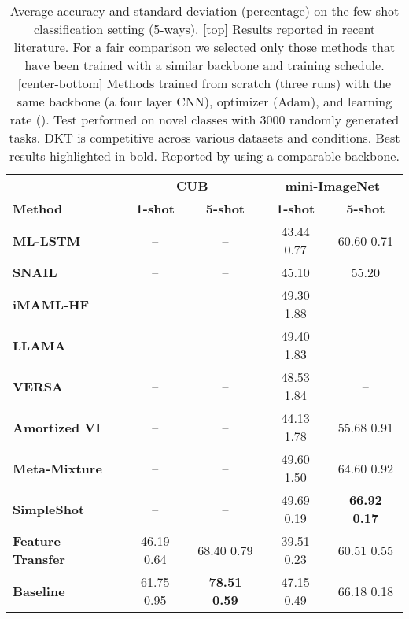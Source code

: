 \documentclass{article}
\begin{document}
\begin{table}[H]
\caption{Average accuracy and standard deviation (percentage) on the few-shot classification setting (5-ways). 
[top] Results reported in recent literature.  
For a fair comparison we selected only those methods that have been trained with a similar backbone and training schedule. [center-bottom] Methods trained from scratch (three runs) with the same backbone (a four layer CNN), optimizer (Adam), and learning rate (). Test performed on novel classes with 3000 randomly generated tasks. DKT is competitive across various datasets and conditions. Best results highlighted in bold. Reported by \citet{jerfel2019reconciling} using a comparable backbone.}
 \begin{adjustbox}{width=1.0\columnwidth,center}
\centering
{
\begin{tabular}{lcccc}
\hline
\textbf{} & \multicolumn{2}{c}{\textbf{CUB}} & \multicolumn{2}{c}{\textbf{mini-ImageNet}} \\
\small{\textbf{Method}} & \textbf{1-shot} & \textbf{5-shot} & \textbf{1-shot} & \textbf{5-shot}\\
\hline
\small{\textbf{ML-LSTM}} \citep{ravi2017optimization} & -- & --  & 43.44  \small{0.77} & 60.60  \small{0.71}\\
\small{\textbf{SNAIL}} \citep{mishra2018simple} & -- & --  & 45.10 & 55.20\\
\small{\textbf{iMAML-HF}} \citep{rajeswaran2019meta} & -- & --  & 49.30  \small{1.88} & --\\
\small{\textbf{LLAMA}} \citep{grant2018recasting} & -- & --  & 49.40  \small{1.83} & --\\
\small{\textbf{VERSA}} \citep{gordon2019meta} & -- & --  & 48.53  \small{1.84} & --\\
\small{\textbf{Amortized VI}} \citep{gordon2019meta} &  -- & --  & 44.13  \small{1.78} & 55.68  \small{0.91}\\
\small{\textbf{Meta-Mixture}} \citep{jerfel2019reconciling} &  -- & --  & 49.60  \small{1.50} & 64.60  \small{0.92}\\
\small{\textbf{SimpleShot}} \citep{wang2019simpleshot} &  -- & --  & 49.69  \small{0.19} & \textbf{66.92  \small{0.17}}\\
\hline
\small{\textbf{Feature Transfer}}
& 46.19  \small{0.64} & 68.40  \small{0.79} & 39.51  \small{0.23} & 60.51  \small{0.55}\\
\small{\textbf{Baseline}} \citep{chen2019closerfewshot} & 61.75  \small{0.95} & \textbf{78.51  \small{0.59}} & 47.15  \small{0.49} & 66.18  \small{0.18}\\

\end{tabular}}
\end{adjustbox}
\end{table}
\end{document}
